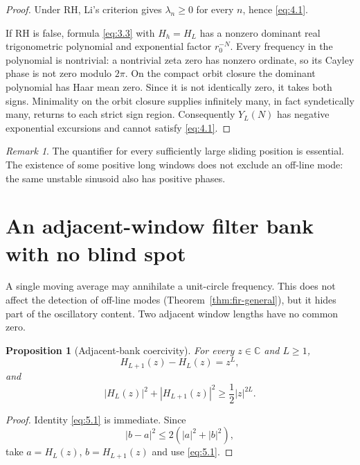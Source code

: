 \documentclass[11pt]{amsart}
\numberwithin{equation}{section}
\newtheorem{proposition}[theorem]{Proposition}
\theoremstyle{definition}
\theoremstyle{remark}
\newtheorem{remark}[theorem]{Remark}
\newcommand{\C}{\mathbb C}
\begin{document}
\begin{proof}
Under RH, Li's criterion \cite{Li} gives \(\lambda_n\ge0\) for every \(n\), hence
\eqref{eq:4.1}.

If RH is false, formula \eqref{eq:3.3} with \(H_h=H_L\) has a nonzero dominant
real trigonometric polynomial and exponential factor \(r_0^{-N}\). Every
frequency in the polynomial is nontrivial: a nontrivial zeta zero has
nonzero ordinate, so its Cayley phase is not zero modulo \(2\pi\). On the
compact orbit closure the dominant polynomial has Haar mean zero. Since it
is not identically zero, it takes both signs. Minimality on the orbit
closure supplies infinitely many, in fact syndetically many, returns to
each strict sign region. Consequently \(Y_L(N)\) has negative exponential
excursions and cannot satisfy \eqref{eq:4.1}.
\end{proof}

\begin{remark}
The quantifier for every sufficiently large sliding position is essential.
The existence of some positive long windows does not exclude an off-line
mode: the same unstable sinusoid also has positive phases.
\end{remark}

\section{An adjacent-window filter bank with no blind spot}

A single moving average may annihilate a unit-circle frequency. This does
not affect the detection of off-line modes (Theorem~\ref{thm:fir-general}),
but it hides part of the oscillatory content. Two adjacent window lengths
have no common zero.

\begin{proposition}[Adjacent-bank coercivity]
\label{prop:bank}
For every \(z\in\C\) and \(L\ge1\),
\begin{equation}
 H_{L+1}(z)-H_L(z)=z^L,                                  \label{eq:5.1}
\end{equation}
and
\begin{equation}
 \boxed{
 |H_L(z)|^2+|H_{L+1}(z)|^2
 \ge\frac12|z|^{2L}.}                                    \label{eq:5.2}
\end{equation}
\end{proposition}

\begin{proof}
Identity \eqref{eq:5.1} is immediate. Since
\[
 |b-a|^2\le2(|a|^2+|b|^2),
\]
take \(a=H_L(z)\), \(b=H_{L+1}(z)\) and use \eqref{eq:5.1}.
\end{proof}
\end{document}
